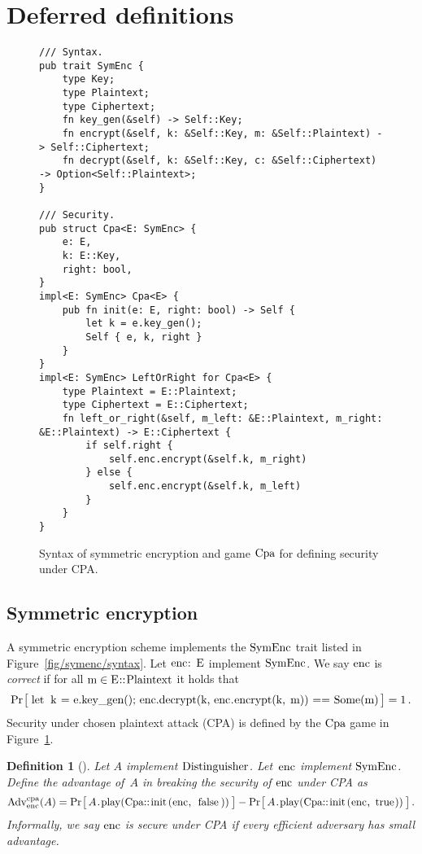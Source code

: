\documentclass{article}
\newtheorem{definition}{Definition}
\newcommand{\Adv}[1]{\textrm{\textup{Adv}}^{\textup{#1}}}
\newcommand{\Prob}[1]{\Pr\hspace{-1pt}\big[\,#1\,\big]}
\newcommand{\code}[1]{\textrm{\textup{\lstinline{#1}}}}
\begin{document}



\appendix


\section{Deferred definitions}

\begin{figure}[t]
\begin{lstlisting}
/// Syntax.
pub trait SymEnc {
    type Key;
    type Plaintext;
    type Ciphertext;
    fn key_gen(&self) -> Self::Key;
    fn encrypt(&self, k: &Self::Key, m: &Self::Plaintext) -> Self::Ciphertext;
    fn decrypt(&self, k: &Self::Key, c: &Self::Ciphertext) -> Option<Self::Plaintext>;
}

/// Security.
pub struct Cpa<E: SymEnc> {
    e: E,
    k: E::Key,
    right: bool,
}
impl<E: SymEnc> Cpa<E> {
    pub fn init(e: E, right: bool) -> Self {
        let k = e.key_gen();
        Self { e, k, right }
    }
}
impl<E: SymEnc> LeftOrRight for Cpa<E> {
    type Plaintext = E::Plaintext;
    type Ciphertext = E::Ciphertext;
    fn left_or_right(&self, m_left: &E::Plaintext, m_right: &E::Plaintext) -> E::Ciphertext {
        if self.right {
            self.enc.encrypt(&self.k, m_right)
        } else {
            self.enc.encrypt(&self.k, m_left)
        }
    }
}
\end{lstlisting}
  \caption{Syntax of symmetric encryption and game $\code{Cpa}$ for defining
  security under CPA.}
  \label{fig/symenc/syntax}
  \label{fig/symenc/security}
\end{figure}



\subsection{Symmetric encryption}
\label{sec/symenc}

A symmetric encryption scheme implements the $\code{SymEnc}$ trait listed in
Figure~\ref{fig/symenc/syntax}.
%
Let $\code{enc: E}$ implement $\code{SymEnc}$.
%
We say $\code{enc}$ is \emph{correct} if for all $\code{m} \in
\code{E::Plaintext}$ it holds that
%
\[
  \Prob{
    \code{let k = e.key_gen();
    enc.decrypt(k, enc.encrypt(k, m)) == Some(m)}
  } = 1 \,.
\]
%
Security under chosen plaintext attack (CPA) is defined by the $\code{Cpa}$
game in Figure~\ref{fig/symenc/security}.

\begin{definition}[{\cite[Definition 7.1]{joy}}]
  Let $A$ implement \hyperref[sec/traits]{$\code{Distinguisher}$}.
  Let~$\code{enc}$ implement \hyperref[fig/symenc/syntax]{$\code{SymEnc}$}.
  Define the advantage of~$A$ in breaking the security of $\code{enc}$ under CPA
  as
  \[
    \Adv{cpa}_{\code{enc}}(A) =
      \Prob{A\code{.play(Cpa::init(enc, false))}} -
      \Prob{A\code{.play(Cpa::init(enc, true))}} \,.
  \]
  Informally, we say $\code{enc}$ is secure under CPA if every efficient adversary
  has small advantage.
\end{definition}
\end{document}
